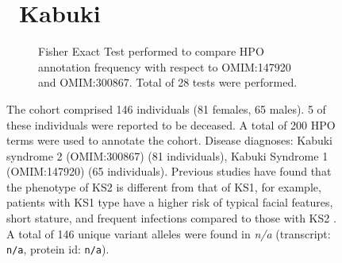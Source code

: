 \begin{figure}[htbp]
\section*{ Kabuki}
\centering
\begin{subfigure}[b]{0.95\textwidth}
\centering
{}
\captionsetup{justification=raggedright,singlelinecheck=false}
\caption{Fisher Exact Test performed to compare HPO annotation frequency with respect to OMIM:147920 and OMIM:300867. Total of
        28 tests were performed. }
\end{subfigure}
\vspace{2em}
\caption{ The cohort comprised 146 individuals (81 females, 65 males). 5 of these individuals were reported to be deceased. 
A total of 200 HPO terms were used to annotate the cohort. Disease diagnoses: Kabuki syndrome 2 (OMIM:300867) (81 individuals), Kabuki Syndrome 1 (OMIM:147920) (65 individuals). 
Previous studies have found that the phenotype of KS2 is different from that of KS1, for example, patients with KS1 type have a higher risk of typical facial features, short stature, 
and frequent infections compared to those with KS2 \cite{PMID_30514738,PMID_23320472,PMID_38373926}.
A total of 146 unique variant alleles were found in \textit{n/a} (transcript: \texttt{n/a}, protein id: \texttt{n/a}).}
\end{figure}
